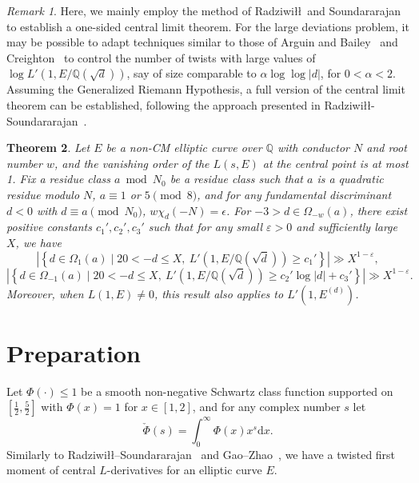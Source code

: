 \documentclass[12pt,reqno]{amsart}
\numberwithin{equation}{section}
\theoremstyle{plain}
\newtheorem{theorem}{Theorem}[section]
\theoremstyle{definition}
\theoremstyle{remark}
\newtheorem{remark}[theorem]{Remark}
\newcommand{\dd}{\mathrm{d}}
\begin{document}
\begin{remark}
  Here, we mainly employ the method of Radziwi\l\l\ and Soundararajan to establish a one-sided central limit theorem.
  For the large deviations problem, it may be possible to adapt techniques similar to those of Arguin and Bailey~\cite{ArguinBailey2022} and Creighton~\cite{Creighton2025} to control the number of twists with large values of \(\log L'(1, E/\mathbb{Q}(\sqrt{d}))\), say of size comparable to \(\alpha \log \log |d|\), for \(0 <\alpha <2\).
Assuming the Generalized Riemann Hypothesis, a full version of the central limit theorem can be established, following the approach presented in Radziwi\l\l\--Soundararajan~\cite{RadziwillSoundararajan2024}.
\end{remark}

\begin{theorem}\label{thm:lowerbound-L}
Let \( E \) be a non-CM elliptic curve over \( \mathbb{Q} \) with conductor \( N \) and root number \( w \), and the vanishing order of the \(L(s,E)\) at the central point is at most 1.
Fix a residue class \( a \bmod N_0 \) be a residue class such that \( a \) is a quadratic residue modulo \( N \), \( a \equiv 1 \) or \( 5 \pmod{8} \),
and for any fundamental discriminant $d<0$ with $d\equiv a \pmod{N_0}$, $ w\chi_d(-N)=\epsilon$.
For \( -3>d\in  \Omega_{-w}(a)\), there exist positive constants \( c_1', c_2', c_3' \) such that for any small \( \varepsilon > 0 \) and sufficiently large \( X \), we have
\[
\left|\left\{
 d \in \Omega_{1}(a) \mid 20 < -d \leq X,\
L'(1, E/\mathbb{Q}(\sqrt{d})) \geq c_1'
\right\}\right| \gg X^{1 - \varepsilon},
\]
\[
\left|\left\{
 d \in \Omega_{-1}(a) \mid 20 < -d \leq X,\
L'(1, E/\mathbb{Q}(\sqrt{d}))\geq c_2' \log|d| + c_3'
\right\}\right| \gg X^{1 - \varepsilon}.
\]
Moreover, when \(L(1,E)\neq 0\), this result also applies to \(L'(1, E^{(d)})\).
\end{theorem}


\section{Preparation}\label{sec:lemmas}
Let $\Phi(\cdot)\leq 1$ be a smooth non-negative Schwartz class function supported on $[\frac{1}{2},\frac{5}{2}]$ with $\Phi(x)=1$ for $x\in [1,2]$, and for any complex number $s$ let
\begin{equation*}
  \check\Phi(s)=\int_{0}^{\infty}\Phi(x)x^s\dd x.
\end{equation*}
Similarly to Radziwi\l\l--Soundararajan~\cite{RadziwillSoundararajan2015} and Gao--Zhao~\cite{GaoZhao2024}, we have a twisted first moment of central $L$-derivatives for an elliptic curve $E$.
\end{document}
